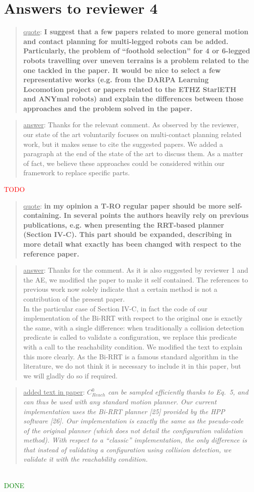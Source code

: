 \documentclass[a4paper]{article}
\newcommand{\done}[0]{\textcolor{green}{DONE}}
\newcommand{\ndone}[0]{\textcolor{red}{TODO}}
\newcommand\quot[1]{\begin{quote} \underline{quote}: \textbf{#1}\end{quote}}
\newcommand\as[1]{\begin{quote} \underline{answer}: {#1}\end{quote} }
\newcommand\qt[1]{\begin{quote} \underline{added text in paper}: \textit{#1}\end{quote} \leavevmode \\ }
\begin{document}
\section{Answers to reviewer 4}

\quot{ I suggest that a few papers related to more general motion and contact planning for multi-legged robots can be added. Particularly, the problem of ``foothold selection'' for 4 or 6-legged robots travelling over uneven terrains is a problem related to the one tackled in the paper. It would be nice to select a few representative works (e.g. from the DARPA Learning Locomotion project or
papers related to the ETHZ StarlETH and ANYmal robots) and explain the differences between those approaches and the problem solved in the paper.}
\as{Thanks for the relevant comment. As observed by the reviewer, our state of the art voluntarily focuses on multi-contact planning related work, but it makes sense to cite the suggested papers. We added a paragraph at the end of the state of the art to discuss them. As a matter of fact, we believe these approaches could be considered within
our framework to replace specific parts.}\ndone

\quot{in my opinion a T-RO regular paper should be more self-containing. In several points the authors heavily rely on previous publications, e.g. when presenting the RRT-based planner (Section IV-C). This part should be expanded, describing in more detail what exactly has been changed with respect to the reference paper. }
\as{Thanks for the comment. As it is also suggested by reviewer 1 and the AE, we modified the paper to make it self contained. The references to previous work now solely indicate
that a certain method is not a contribution of the present paper. \\ 
In the particular case of Section IV-C, in fact the code of our implementation of the Bi-RRT with respect to the original one is exactly the same, with a single difference: when
traditionally a collision detection predicate is called to validate a configuration, we replace this predicate with a call to the reachability condition. We modified the text to explain this more clearly. As the Bi-RRT is a famous standard algorithm in the literature, we do not think it is necessary to include it in this paper, but we will gladly do so if required. }
\qt{$C_{Reach}^0$ can be sampled efficiently thanks to Eq.~5, and can thus be used with any standard motion planner.
Our current implementation uses the Bi-RRT planner [25] provided by the HPP software [26].
Our implementation is exactly the same as the pseudo-code of the original planner (which does not detail the configuration validation method). With respect to a ``classic'' implementation, the only difference is that instead of validating a configuration using collision detection, we validate it with the \textit{reachability condition}.} \done
\end{document}
